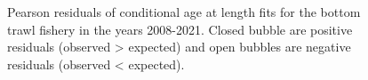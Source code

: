 \documentclass[
]{scrartcl}
\begin{document}
\begin{figure}[H]


\caption{\label{fig-peasrson-resids-age-bt1}Pearson residuals of
conditional age at length fits for the bottom trawl fishery in the years
2008-2021. Closed bubble are positive residuals (observed \textgreater{}
expected) and open bubbles are negative residuals (observed \textless{}
expected).}

\end{figure}%
\end{document}

